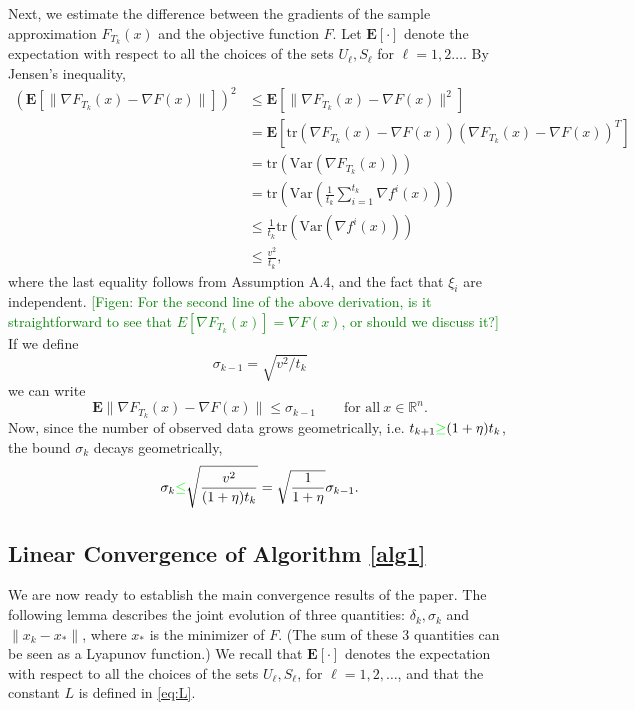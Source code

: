 \documentclass[11pt]{article}
\newcommand{\Var}{\mathrm{Var}}
\newcommand{\E}{\mathbf{E}}
\begin{document}
Next, we estimate the difference between the gradients of the sample approximation $F_{T_k}(x)$  and the objective function $F$.  Let $\E [\cdot]$ denote the expectation with respect to all the choices of the sets $U_\ell, S_\ell$ for $\ell=1, 2 \ldots$.
By Jensen's inequality,
\begin{align*}
 (\E [\|\nabla F_{T_k}(x) - \nabla F(x)\| ])^2 & \leq \E [ \|\nabla F_{T_k}(x) - \nabla F(x)\|^2 ]\\
  & = \E[\mbox{tr}(\nabla F_{T_k}(x) - \nabla F(x))(\nabla F_{T_k}(x) - \nabla F(x))^T]\\
  & = \mbox{tr}(\Var (\nabla F_{T_k}(x) )) \\
  & = \mbox{tr}\left(\Var \left(\frac{1}{t_{k}}\sum_{i=1}^{t_k} \nabla f^i(x)\right) \right) \\
  & \leq \frac{1}{t_k}\mbox{tr}(\Var(\nabla f^i(x))) \\
  &  \leq \frac{v^2}{t_k} ,
\end{align*}
where the last equality follows from Assumption A.4, and the fact that $\xi_i$ are independent.
\textcolor{green}{[Figen: For the second line of the above derivation, is it straightforward to see that $E[\nabla F_{T_k}(x)]=\nabla F(x)$, or should we discuss it?]}
If we define
\begin{equation}   \label{sigmad}
 \sigma_{k-1} = \sqrt{{v^2}/{t_k}}
 \end{equation}
 we can write
\begin{equation}\label{vat}
 \E \|\nabla F_{T_k}(x) - \nabla F(x)\| \leq \sigma_{k-1} \qquad\mbox{for all} \ x \in \mathbb{R}^n.
\end{equation}
Now, since the number of observed data grows geometrically,  i.e. $t_{k+1} \textcolor{green}{\geq} (1+\eta)t_k$, the bound $\sigma_k$ decays geometrically,
\begin{equation} \label{sigma}
 \sigma_k \textcolor{green}{\leq} \sqrt{\frac{v^2}{(1+\eta)t_k}} = \sqrt{ \frac{1}{1+\eta}} \sigma_{k-1}.
\end{equation}

\subsection{Linear Convergence of Algorithm \ref{alg1}}

We are now ready to establish the main convergence results of the paper.
The following lemma describes the joint evolution of three quantities:  $\delta_k, \sigma_k$ and  $ \| x_k - x_*\|$, where $x_*$ is the minimizer of $F$. (The sum of these 3 quantities can be seen as a Lyapunov function.) We recall that  $\E [\cdot]$ denotes the expectation with respect to all the choices of  the sets $U_\ell, S_\ell$, for $\ell = 1, 2, \ldots $, and that the constant $L$ is defined in \eqref{eq:L}. 
\end{document}
